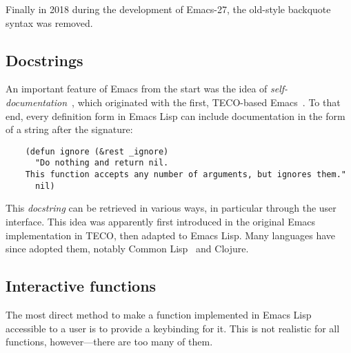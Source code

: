 \documentclass[format=acmsmall, review]{acmart}
\newcommand \Elisp {Emacs Lisp}
\begin{document}
Finally in 2018 during the development of Emacs-27, the
old-style backquote syntax was removed.

\subsection{Docstrings}
\label{sec:docstrings}

An important feature of Emacs from the start was the idea of
\emph{self-documentation}~\cite{Stallman1981}, which originated with
the first, TECO-based Emacs~\cite{Stallman2018-personal}.  To that end, every
definition form in \Elisp{} can include documentation in the form of a
string after the signature:
\begin{verbatim}
    (defun ignore (&rest _ignore)
      "Do nothing and return nil.
    This function accepts any number of arguments, but ignores them."
      nil)
\end{verbatim}
This \emph{docstring} can be retrieved in various ways, in particular
through the user interface.  This idea was apparently first introduced in
the original Emacs implementation in TECO, then adapted to \Elisp{}.
Many languages have since adopted them, notably Common
Lisp~\cite{HyperSpec} and Clojure.

\subsection{Interactive functions}
\label{sec:interactive-functions}

The most direct method to make a function implemented in \Elisp{}
accessible to a user is to provide a keybinding for it.  This is not
realistic for all functions, however---there are too many of them.
\end{document}
